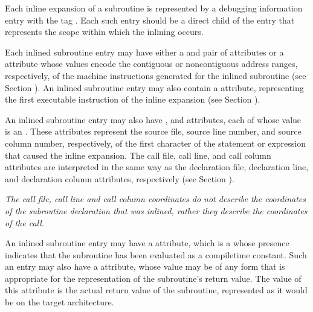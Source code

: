 Each inline expansion of a subroutine is represented
by a debugging information entry with the 
tag \DWTAGinlinedsubroutineTARG. 
Each such entry should be a direct
child of the entry that represents the scope within which
the inlining occurs.

Each inlined subroutine entry may have either a 
\DWATlowpc{}
and \DWAThighpc{} pair 
of 
attributes 
or 
a 
\DWATranges{}
attribute whose values encode the contiguous or non\dash contiguous
address ranges, respectively, of the machine instructions
generated for the inlined subroutine (see 
Section ). 
An
\hypertarget{chap:DWATentrypcentryaddressofinlinedsubprogram}{}
inlined subroutine entry may 
also 
contain 
a 
\DWATentrypc{}
attribute, representing the first executable instruction of
the inline expansion (see 
Section ).

An inlined 
\hypertarget{chap:DWATcalllinelinenumberofinlinedsubroutinecall}{}
subroutine 
\hypertarget{chap:DWATcallcolumncolumnpositionofinlinedsubroutinecall}{}
entry 
\hypertarget{chap:DWATcallfilefilecontaininginlinedsubroutinecall}{}
may also have \DWATcallfile,
\DWATcallline{} and \DWATcallcolumn{} attributes, 
each of whose
value is an . 
These attributes represent the
source file, source line number, and source column number,
respectively, of the first character of the statement or
expression that caused the inline expansion. The call file,
call line, and call column attributes are interpreted in
the same way as the declaration file, declaration line, and
declaration column attributes, respectively (see 
Section ).

\textit{The call file, call line and call column coordinates do not
describe the coordinates of the subroutine declaration that
was inlined, rather they describe the coordinates of the call.
}

An inlined subroutine entry 
\hypertarget{chap:DWATconstexprcompiletimeconstantfunction}{}
may have a 
\DWATconstexpr{}
attribute, which is a  
whose presence indicates that the
subroutine has been evaluated as a compile\dash time constant. Such
an entry may also have a \DWATconstvalue{} attribute,
whose value may be of any form that is appropriate for the
representation of the subroutine's return value. The value of
this attribute is the actual return value of the subroutine,
represented as it would be on the target architecture.

